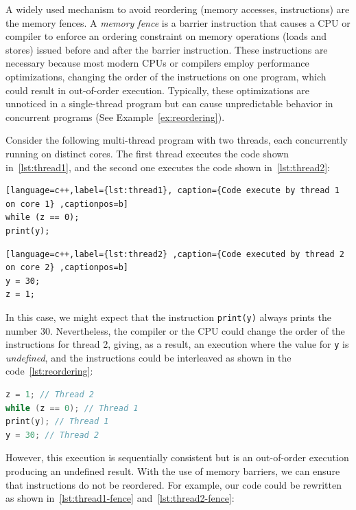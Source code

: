 A widely used mechanism to avoid reordering (memory accesses, instructions) are the memory fences. A \emph{memory fence} is a barrier instruction that causes a CPU or compiler to enforce an ordering constraint on memory operations (loads and stores) issued before and after the barrier instruction. These instructions are necessary because most modern CPUs or compilers employ performance optimizations, changing the order of the instructions on one program, which could result in out-of-order execution. Typically, these optimizations are unnoticed in a single-thread program but can cause unpredictable behavior in concurrent programs (See Example~\ref{ex:reordering}).

\begin{example}
\label{ex:reordering}
Consider the following multi-thread program with two threads, each concurrently running on distinct cores. The first thread executes the code shown in~\ref{lst:thread1}, and the second one executes the code shown in~\ref{lst:thread2}:

\begin{lstlisting}[language=c++,label={lst:thread1}, caption={Code execute by thread 1 on core 1} ,captionpos=b]
while (z == 0);
print(y);
\end{lstlisting}

\begin{lstlisting}[language=c++,label={lst:thread2} ,caption={Code executed by thread 2 on core 2} ,captionpos=b]
y = 30;
z = 1;
\end{lstlisting}


In this case, we might expect that the instruction \texttt{print(y)} always prints the number 30. Nevertheless, the compiler or the CPU could change the order of the instructions for thread 2, giving, as a result, an execution where the value for \texttt{y} is \emph{undefined}, and the instructions could be interleaved as shown in the code~\ref{lst:reordering}:

\begin{lstlisting}[language=c++,label={lst:reordering},caption={Code reordered by CPU}, captionpos=b]
z = 1; // Thread 2
while (z == 0); // Thread 1
print(y); // Thread 1
y = 30; // Thread 2
\end{lstlisting}

However, this execution is sequentially consistent but is an out-of-order execution producing an undefined result. With the use of memory barriers, we can ensure that instructions do not be reordered. For example, our code could be rewritten as shown in~\ref{lst:thread1-fence} and~\ref{lst:thread2-fence}:


\end{example}

